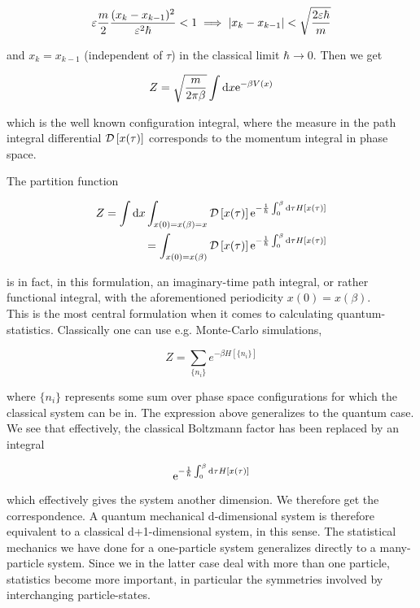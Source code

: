 \begin{equation*}
    \varepsilon \frac{m}{2} \frac{(x_{k} - x_{k-1})^{2}}{\varepsilon^{2} \hbar} < 1 \implies \abs{x_{k} - x_{k-1}} < \sqrt{\frac{2\varepsilon \hbar}{m}}
\end{equation*}

and $x_{k} = x_{k-1}$ (independent of $\tau$) in the classical limit $\hbar \to 0$. Then we get 

\begin{equation*}
    Z = \sqrt{\frac{m}{2\pi \beta}} \int \dd x \mathrm{e}^{-\beta V(x)}
\end{equation*}

which is the well known configuration integral, where the measure in the path integral differential $\mathcal{D} \left[x(\tau)\right]$ corresponds to the momentum integral in phase space. 

The partition function

\begin{align*}
    Z = \int \dd x  \int_{x(0) = x(\beta) = x} \mathcal{D} \left[x(\tau)\right] \mathrm{e}^{-\frac{1}{\hbar}\int_{0}^{\beta} \dd \tau H\left[x(\tau)\right]} \\ = \int_{x(0) = x(\beta)} \mathcal{D} \left[x(\tau)\right] \mathrm{e}^{-\frac{1}{\hbar}\int_{0}^{\beta} \dd \tau H\left[x(\tau)\right]}
\end{align*}

is in fact, in this formulation, an imaginary-time path integral, or rather functional integral, with the aforementioned periodicity $x(0) = x(\beta)$.  \\ 

This is the most central formulation when it comes to calculating quantum-statistics. Classically one can use e.g. Monte-Carlo simulations, 

\begin{equation*}
    Z = \sum_{\{n_{i}\}}e^{-\beta H \left[ \{n_{i}\}\right]}
\end{equation*}

where $\{n_{i}\}$ represents some sum over phase space configurations for which the classical system can be in. The expression above generalizes to the quantum case. We see that effectively, the classical Boltzmann factor has been replaced by an integral 

\begin{equation*}
    \mathrm{e}^{-\frac{1}{\hbar}\int_{0}^{\beta} \dd \tau H\left[x(\tau)\right]}
\end{equation*}

which effectively gives the system another dimension. We therefore get the correspondence. A quantum mechanical d-dimensional system is therefore equivalent to a classical d+1-dimensional system, in this sense. The statistical mechanics we have done for a one-particle system generalizes directly to a many-particle system. Since we in the latter case deal with more than one particle, statistics become more important, in particular the symmetries involved by interchanging particle-states. 

